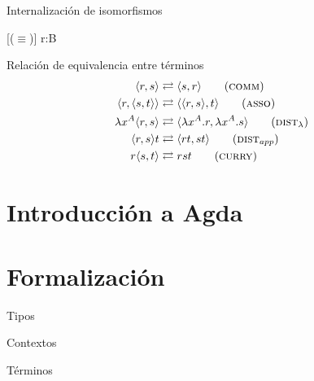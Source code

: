 \documentclass[aspectratio=149]{beamer}
\begin{document}
\begin{frame}{Internalización de isomorfismos}
	\begin{center}
		\begin{prooftree}
			[($\equiv$)]{ \Gamma \vdash r:B }
		\end{prooftree}
	\end{center}
	
\end{frame}

\begin{frame}{Relación de equivalencia entre términos}
	\begin{align}
		\langle r,s \rangle &\rightleftarrows \langle s,r \rangle \tag{\textsc{comm}} \\
		\langle r, \langle s,t \rangle \rangle &\rightleftarrows \langle \langle r, s \rangle, t \rangle \tag{\textsc{asso}} \\
		\lambda x^A \langle r,s \rangle &\rightleftarrows \langle \lambda x^A.r, \lambda x^A.s \rangle \tag{$\textsc{dist}_{\lambda}$} \\
		\langle r,s \rangle t &\rightleftarrows \langle r t, s t \rangle \tag{$\textsc{dist}_{app}$} \\
		r \langle s, t \rangle &\rightleftarrows r s t \tag{\textsc{curry}}
	\end{align}
\end{frame}

\section{Introducción a Agda}
\section{Formalización}


\begin{frame}{Tipos}
	
\end{frame}

\begin{frame}{Contextos}
\end{frame}

\begin{frame}[allowframebreaks]{Términos}
	\pagebreak
	\pagebreak

\end{frame}
\end{document}
